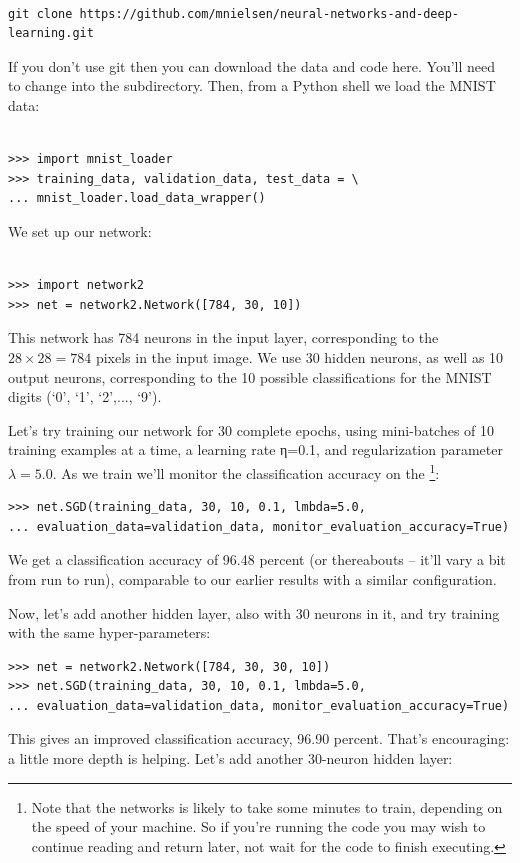 \documentclass[a4paper,twoside,10pt]{book}
\begin{document}
\begin{lstlisting}

git clone https://github.com/mnielsen/neural-networks-and-deep-learning.git

\end{lstlisting}
If you don't use git then you can download the data and code here. You'll need to change into the  subdirectory.
Then, from a Python shell we load the MNIST data:

\begin{lstlisting}

>>> import mnist_loader
>>> training_data, validation_data, test_data = \
... mnist_loader.load_data_wrapper()

\end{lstlisting}
We set up our network:

\begin{lstlisting}

>>> import network2
>>> net = network2.Network([784, 30, 10])

\end{lstlisting}
This network has 784 neurons in the input layer, corresponding to the $28\times28=784$ pixels in the input image. We use 30 hidden neurons, as well as 10 output neurons, corresponding to the 10 possible classifications for the MNIST digits (`0', `1', `2',..., `9').

Let's try training our network for 30 complete epochs, using mini-batches of 10 training examples at a time, a learning rate η=0.1, and regularization parameter $\lambda=5.0$. As we train we'll monitor the classification accuracy on the \footnote{Note that the networks is likely to take some minutes to train, depending on the speed of your machine. So if you're running the code you may wish to continue reading and return later, not wait for the code to finish executing.}:
\begin{lstlisting}
>>> net.SGD(training_data, 30, 10, 0.1, lmbda=5.0, 
... evaluation_data=validation_data, monitor_evaluation_accuracy=True)
\end{lstlisting}
We get a classification accuracy of 96.48 percent (or thereabouts -- it'll vary a bit from run to run), comparable to our earlier results with a similar configuration.

Now, let's add another hidden layer, also with 30 neurons in it, and try training with the same hyper-parameters:

\begin{lstlisting}
>>> net = network2.Network([784, 30, 30, 10])
>>> net.SGD(training_data, 30, 10, 0.1, lmbda=5.0, 
... evaluation_data=validation_data, monitor_evaluation_accuracy=True)
\end{lstlisting}
This gives an improved classification accuracy, 96.90 percent. That's encouraging: a little more depth is helping. Let's add another 30-neuron hidden layer:
\end{document}
